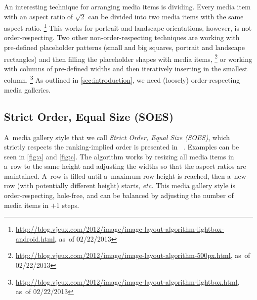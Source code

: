 \documentclass{sig-alternate}
\newcommand{\inlinelistingsize}{\fontsize{8pt}{11pt}}
\let\oldurl\url
\renewcommand{\url}[1]{\inlinelistingsize\oldurl{#1}}
\begin{document}
An interesting technique for arranging media items is dividing.
Every media item with an aspect ratio of $ \sqrt2 $ can be divided
into two media items with the same aspect ratio.%
\footnote{\url{http://blog.vjeux.com/2012/image/image-layout-algorithm-lightbox-android.html},
as~of 02/22/2013}
This works for portrait and landscape orientations,
however, is not order-respecting.
Two other non-order-respecting techniques are working
with pre-defined placeholder patterns
(small and big squares, portrait and landscape rectangles)
and then filling the placeholder shapes with media items,%
\footnote{\url{http://blog.vjeux.com/2012/image/image-layout-algorithm-500px.html},
as~of 02/22/2013}
or working with columns of pre-defined widths
and then iteratively inserting in the smallest column.%
\footnote{\url{http://blog.vjeux.com/2012/image/image-layout-algorithm-lightbox.html},
as~of 02/22/2013}
As outlined in \autoref{sec:introduction},
we need (loosely) order-respecting media galleries.

\subsection{Strict Order, Equal Size (SOES)}

A~media gallery style that we call \emph{Strict Order, Equal Size (SOES)},
which strictly respects the ranking-implied order is presented in~%
\cite{chedeau2012googleplus}.
Examples can be seen in \autoref{fig:a} and \autoref{fig:c}.
The algorithm works by resizing all media items in a~row to the same height
and adjusting the widths so that the aspect ratios are maintained.
A~row is filled until a~maximum row height is reached,
then a~new row (with potentially different height) starts, \emph{etc.}
This media gallery style is order-respecting, hole-free,
and can be balanced by adjusting the number
of media items in $+1$ steps.
\end{document}
